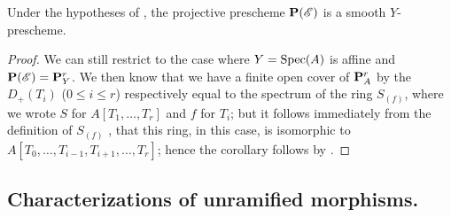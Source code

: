 \begin{corollary}[17.3.9]
\label{IV.17.3.9}
Under the hypotheses of , the projective prescheme $\mathbf{P}(\mathscr{E})$  is a smooth $Y$-prescheme.
\end{corollary}

\begin{proof}
We can still restrict to the case where $Y=\operatorname{Spec}(A)$ is affine and $\mathbf{P}(\mathscr{E})=\mathbf{P}_Y^r$.
We then know  that we have a finite open cover of $\mathbf{P}^r_{A}$ by the $D_+(T_i)$ ($0\leq i\leq r$) respectively equal to the spectrum of the ring $S_{(f)}$, where we wrote $S$ for $A[T_1,\dots,T_r]$ and $f$ for $T_i$;
but it follows immediately from the definition of $S_{(f)}$ , that this ring, in this case, is isomorphic to $A[T_0,\dots,T_{i-1},T_{i+1},\dots,T_r]$;
hence the corollary follows by .
\end{proof}

\subsection{Characterizations of unramified morphisms.}
\label{subection:IV.17.4} 



